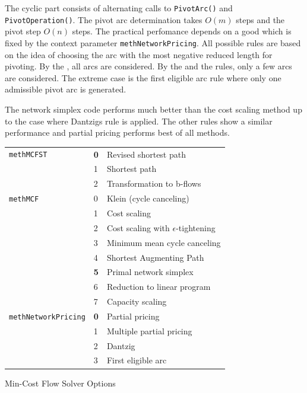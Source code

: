 \documentclass[a4paper,11pt,twoside]{book}
\begin{document}
\begin{multicols}{2}
The cyclic part consists of alternating calls to \verb/PivotArc()/
and \verb/PivotOperation()/. The pivot arc determination takes $O(m)$
steps and the pivot step $O(n)$ steps. The practical perfomance depends
on a good  which is fixed by the context parameter
\verb/methNetworkPricing/. All possible rules are based on the idea of
choosing the arc with the most negative reduced length for pivoting.
By the , all arcs are considered. By the 
and the  rules, only a few arcs are considered.
The extreme case is the {first eligible arc rule} where only one admissible
pivot arc is generated.

The network simplex code performs much better than the cost scaling method
up to the case where Dantzigs rule is applied. The other rules show a similar
performance and partial pricing performs best of all methods.



\begin{tablehere}
\begin{center}
\vspace*{1cm}
\begin{tabular}{|l|l|l|}
\hline
\verb/methMCFST/    & {\bf 0} & Revised shortest path \\
                    & 1 & Shortest path \\
                    & 2 & Transformation to b-flows \\
\hline
\verb/methMCF/      & 0 & Klein (cycle canceling) \\
                    & 1 & Cost scaling \\
                    & 2 & Cost scaling with $\epsilon$-tightening \\
                    & 3 & Minimum mean cycle canceling \\
                    & 4 & Shortest Augmenting Path \\
                    & {\bf 5} & Primal network simplex \\
                    & 6 & Reduction to linear program \\
                    & 7 & Capacity scaling \\
\hline
\verb/methNetworkPricing/
                    & {\bf 0} & Partial pricing \\
                    & 1 & Multiple partial pricing \\
                    & 2 & Dantzig \\
                    & 3 & First eligible arc \\
\hline
\end{tabular}
\end{center}
\caption{\label{tlb704}Min-Cost Flow Solver Options}
\end{tablehere}




\end{multicols}
\end{document}
